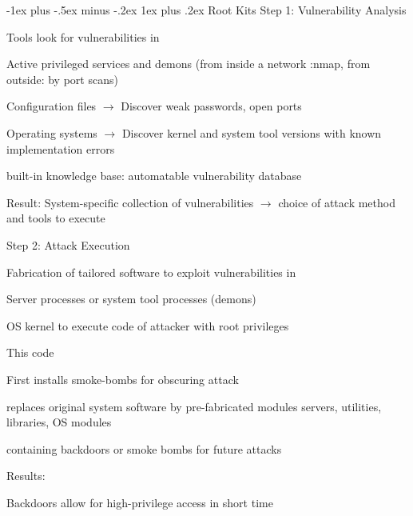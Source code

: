 \documentclass[a4paper]{article}
\makeatletter
\renewcommand{\subsubsection}{\@startsection{subsubsection}{3}{0mm}%
                                {-1ex plus -.5ex minus -.2ex}%
                                {1ex plus .2ex}%
                                {\normalfont\small\bfseries}}
\makeatother
\begin{document}
\begin{multicols}{3}
    \subsubsection{Root Kits}
    Step 1: Vulnerability Analysis
    \begin{itemize*}
        \item Tools look for vulnerabilities in
        \begin{itemize*}
            \item Active privileged services and demons (from inside a network :nmap, from outside: by port scans)
            \item Configuration files $\rightarrow$ Discover weak passwords, open ports
            \item Operating systems $\rightarrow$ Discover kernel and system tool versions with known implementation errors
        \end{itemize*}
        \item built-in knowledge base: automatable vulnerability database
        \item Result: System-specific collection of vulnerabilities $\rightarrow$ choice of attack method and tools to execute
    \end{itemize*}
    Step 2: Attack Execution
    \begin{itemize*}
        \item Fabrication of tailored software to exploit vulnerabilities in
        \begin{itemize*}
            \item Server processes or system tool processes (demons)
            \item OS kernel to execute code of attacker with root privileges
        \end{itemize*}
        \item This code
        \begin{itemize*}
            \item First installs smoke-bombs for obscuring attack
            \item replaces original system software by pre-fabricated modules servers, utilities, libraries, OS modules
            \item containing backdoors or smoke bombs for future attacks
        \end{itemize*}
        \item Results:
        \begin{itemize*}
            \item Backdoors allow for high-privilege access in short time

\end{itemize*}
\end{itemize*}
\end{multicols}
\end{document}
